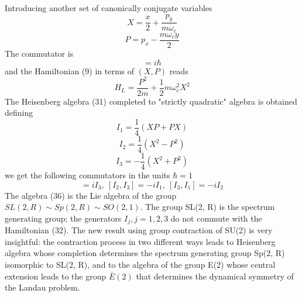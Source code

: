\documentclass[aps, singlecolumn, showpacs]{revtex4-2}
\begin{document}
Introducing another set of canonically conjugate variables
\begin{equation}
X=\frac{x}{2} + \frac{p_y}{m \omega_c}
\end{equation}
\begin{equation}
P = p_x - \frac{m\omega_c y}{2}
\end{equation}
The commutator is
\begin{equation}
[X, P] =i \hbar
\end{equation}
and the Hamiltonian (9) in terms of $(X, P)$ reads
\begin{equation}
H_L = \frac{P^2}{2m} + \frac{1}{2} m \omega_c^2 X^2
\end{equation}
The Heisenberg algebra (31) completed to "strictly quadratic" algebra \cite{21} is obtained defining
\begin{equation}
I_1 = \frac{1}{4} (XP+PX)
\end{equation}
\begin{equation}
I_2 = \frac{1}{4} (X^2 - P^2)
\end{equation}
\begin{equation}
I_3 =-\frac{1}{4} (X^2 + P^2)
\end{equation}
we get the following commutators in the units $\hbar=1$
\begin{equation}
[I_1, I_2] =i I_3, ~ [I_2, I_3] =-i I_1, ~ [I_3, I_1] = -i I_2
\end{equation}
The algebra (36) is the Lie algebra of the group $SL(2, R)\sim Sp(2, R) \sim SO(2,1)$. The group SL(2, R) is the spectrum generating group; the generators $I_j, j=1,2,3$ do not commute with the Hamiltonian (32). The new result using group contraction of SU(2) is very insightful: the contraction process in two different ways leads to Heisenberg algebra whose completion determines the spectrum generating group Sp(2, R) isomorphic to SL(2, R), and to the algebra of the group E(2) whose central extension leads to the group $\bar{E}(2)$ that determines the dynamical symmetry of the Landau problem. 
\end{document}

